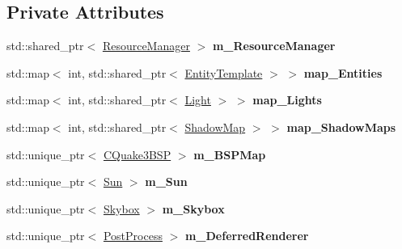 \subsection*{Private Attributes}
\begin{DoxyCompactItemize}
\item 
std\+::shared\+\_\+ptr$<$ \hyperlink{class_resource_manager}{Resource\+Manager} $>$ {\bfseries m\+\_\+\+Resource\+Manager}\hypertarget{class_scene_acbc85b1c81aff53b9caeeda5f43ef3ff}{}\label{class_scene_acbc85b1c81aff53b9caeeda5f43ef3ff}

\item 
std\+::map$<$ int, std\+::shared\+\_\+ptr$<$ \hyperlink{class_entity_template}{Entity\+Template} $>$ $>$ {\bfseries map\+\_\+\+Entities}\hypertarget{class_scene_ae4844d20b0966cd8643a7e1856f290e8}{}\label{class_scene_ae4844d20b0966cd8643a7e1856f290e8}

\item 
std\+::map$<$ int, std\+::shared\+\_\+ptr$<$ \hyperlink{class_light}{Light} $>$ $>$ {\bfseries map\+\_\+\+Lights}\hypertarget{class_scene_acb3044ff71429b332b7ed746990b23e9}{}\label{class_scene_acb3044ff71429b332b7ed746990b23e9}

\item 
std\+::map$<$ int, std\+::shared\+\_\+ptr$<$ \hyperlink{class_shadow_map}{Shadow\+Map} $>$ $>$ {\bfseries map\+\_\+\+Shadow\+Maps}\hypertarget{class_scene_a284b38fe21e6d87fedb28e0d4e38b6ac}{}\label{class_scene_a284b38fe21e6d87fedb28e0d4e38b6ac}

\item 
std\+::unique\+\_\+ptr$<$ \hyperlink{class_c_quake3_b_s_p}{C\+Quake3\+B\+SP} $>$ {\bfseries m\+\_\+\+B\+S\+P\+Map}\hypertarget{class_scene_afa20f77078a752abb08e53ab5eb0b4c6}{}\label{class_scene_afa20f77078a752abb08e53ab5eb0b4c6}

\item 
std\+::unique\+\_\+ptr$<$ \hyperlink{class_sun}{Sun} $>$ {\bfseries m\+\_\+\+Sun}\hypertarget{class_scene_ac639c6e2ba159df8632bbe7cc4f9d461}{}\label{class_scene_ac639c6e2ba159df8632bbe7cc4f9d461}

\item 
std\+::unique\+\_\+ptr$<$ \hyperlink{class_skybox}{Skybox} $>$ {\bfseries m\+\_\+\+Skybox}\hypertarget{class_scene_adedb9598cae5aed3d68d6dfec392116d}{}\label{class_scene_adedb9598cae5aed3d68d6dfec392116d}

\item 
std\+::unique\+\_\+ptr$<$ \hyperlink{class_post_process}{Post\+Process} $>$ {\bfseries m\+\_\+\+Deferred\+Renderer}\hypertarget{class_scene_ae3c64ce169a652d6bcf1fc3120f0a702}{}\label{class_scene_ae3c64ce169a652d6bcf1fc3120f0a702}


\end{DoxyCompactItemize}
